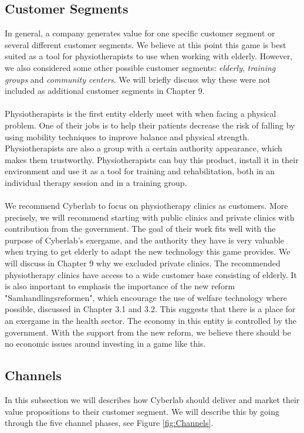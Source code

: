 \subsection{Customer Segments}
In general, a company generates value for one specific customer segment or several different customer segments. We believe at this point this game is best suited as a tool for physiotherapists to use when working with elderly. However, we also considered some other possible customer segments: \emph{elderly}, \emph{training groups} and \emph{community centers}. We will briefly discuss why these were not included as additional customer segments in Chapter 9.\\ \\ 
Physiotherapists is the first entity elderly meet with when facing a physical problem. One of their jobs is to help their patients decrease the risk of falling by using mobility techniques to improve balance and physical strength. Physiotherapists are also a group with a certain authority appearance, which makes them trustworthy. Physiotherapists can buy this product, install it in their environment and use it as a tool for training and rehabilitation, both in an individual therapy session and in a training group. \\ \\
We recommend Cyberlab to focus on physiotherapy clinics as customers. More precisely, we will recommend starting with public clinics and private clinics with contribution from the government. The goal of their work fits well with the purpose of Cyberlab's exergame, and the authority they have is very valuable when trying to get elderly to adapt the new technology this game provides. We will discuss in Chapter 9 why we excluded private clinics. The recommended physiotherapy clinics have access to a wide customer base consisting of elderly. It is also important to emphasis the importance of the new reform "Samhandlingsreformen", which encourage the use of welfare technology where possible, discussed in Chapter 3.1 and 3.2. This suggests that there is a place for an exergame in the health sector.  The economy in this entity is controlled by the government. With the support from the new reform, we believe there should be no economic issues around investing in a game like this. 

\subsection{Channels}
In this subsection we will describes how Cyberlab should deliver and market their value propositions to their customer segment. We will describe this by going through the five channel phases, see Figure \ref{fig:Channels}.\\ \\

